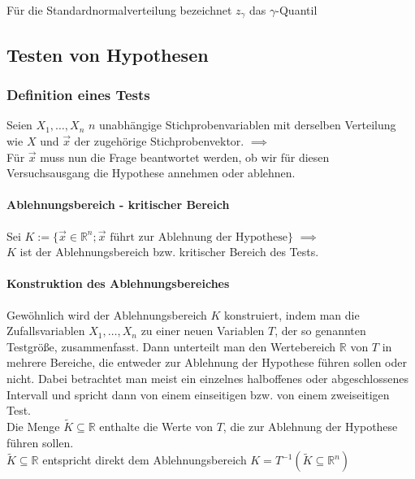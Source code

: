 \documentclass[a4paper,9pt]{extarticle}
\begin{document}
Für die Standardnormalverteilung bezeichnet $z_{\gamma}$ das $\gamma$-Quantil

\subsection*{Testen von Hypothesen}

\subsubsection*{Definition eines Tests}
Seien $X_1, \dots, X_n$ $n$ unabhängige Stichprobenvariablen mit derselben Verteilung wie $X$ und $\vec{x}$ der zugehörige Stichprobenvektor. $\implies$ \\
Für $\vec{x}$ muss nun die Frage beantwortet werden, ob wir für diesen Versuchsausgang die Hypothese annehmen oder ablehnen.

\paragraph*{Ablehnungsbereich - kritischer Bereich}
Sei $K := \{\vec{x} \in \mathbb{R}^n; \vec{x} \text{ führt zur Ablehnung der Hypothese}\}$ $\implies$ \\
$K$ ist der Ablehnungsbereich bzw. kritischer Bereich des Tests.

\paragraph*{Konstruktion des Ablehnungsbereiches}
Gewöhnlich wird der Ablehnungsbereich $K$ konstruiert, indem man die Zufallsvariablen $X_1, \dots,X_n$ zu einer neuen Variablen $T$, der so genannten Testgröße, zusammenfasst. Dann unterteilt man den Wertebereich $\mathbb{R}$ von $T$ in mehrere Bereiche, die entweder zur Ablehnung der Hypothese führen sollen oder nicht. Dabei betrachtet man meist ein einzelnes halboffenes oder abgeschlossenes Intervall und spricht dann von einem einseitigen bzw. von einem zweiseitigen Test. \\

Die Menge $\tilde{K} \subseteq \mathbb{R}$ enthalte die Werte von $T$, die zur Ablehnung der Hypothese führen sollen. \\
$\tilde{K} \subseteq \mathbb{R}$ entspricht direkt dem Ablehnungsbereich $K = T^{-1}(\tilde{K} \subseteq \mathbb{R}^n)$
\end{document}
